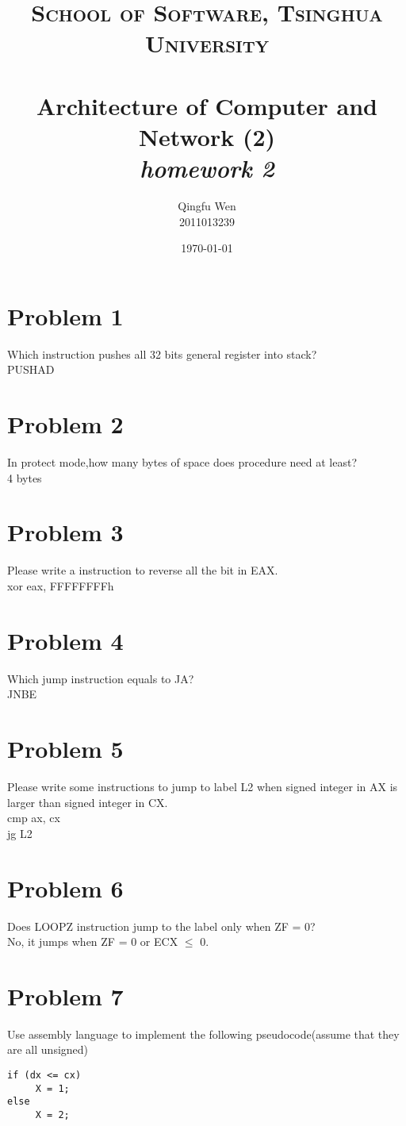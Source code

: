 \documentclass[paper=a4, fontsize=11pt]{scrartcl} %
\title{	
\normalfont \normalsize
\textsc{School of Software, Tsinghua University} \\ [25pt] %
\horrule{0.5pt} \\[0.4cm] %
\huge Architecture of Computer and Network (2)\\ %
\LARGE\textit{homework 2}
\horrule{2pt} \\[0.5cm] %
}
\author{Qingfu Wen \\ \normalsize 2011013239} %
\date{\normalsize\today} %
\numberwithin{equation}{section} %
\numberwithin{figure}{section} %
\numberwithin{table}{section} %
\begin{document}
\maketitle %
\tableofcontents
\newpage

\section{Problem 1}
Which instruction pushes all 32 bits general register into stack?\\
PUSHAD

\section{Problem 2}
In protect mode,how many bytes of space does procedure need at least? \\
4 bytes


\section{Problem 3}
Please write a instruction to reverse all the bit in EAX.\\
xor eax, FFFFFFFFh

\section{Problem 4}
Which jump instruction equals to JA? \\
JNBE

\section*{Problem 5}
Please write some instructions to jump to label L2 when signed integer in AX is larger than signed integer in CX.\\
cmp ax, cx \\
jg L2

\section{Problem 6}
Does LOOPZ instruction jump to the label only when ZF = 0?\\
No, it jumps when ZF = 0 or ECX $\leq$ 0.

\section{Problem 7}
Use assembly language to implement the following pseudocode(assume that they are all unsigned)\\
\begin{lstlisting}[language={[ANSI]C}]
if (dx <= cx)
     X = 1;
else
     X = 2;
\end{lstlisting}
\end{document}
